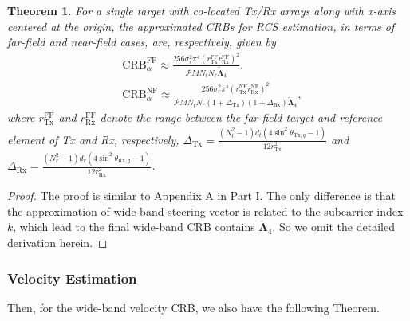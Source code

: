 \documentclass[9pt,final,journal,twocolumn]{IEEEtran}
\newtheorem{theorem}{Theorem}
\begin{document}
\begin{theorem}
For a single target with co-located Tx/Rx arrays
along with x-axis centered at the origin, the approximated CRBs for RCS
estimation, in terms of far-field and near-field cases, are,
respectively, given by
\begin{subequations} \label{CRB_RCS.2}
\begin{flalign} 
&\mathrm{CRB}_{\alpha}^{\mathrm{FF}}  \approx \frac{256\sigma_r^2\pi^{4}(r_{\mathrm{Tx}}^{\mathrm{FF}}r_{\mathrm{Rx}}^{\mathrm{FF}})^2}{\mathcal{P}M{N_t}{N_r}\widetilde{\bm\Lambda}_4}. \label{CRB_RCS.1.2}\\
&\mathrm{CRB}_{\alpha}^{\mathrm{NF}} \! \approx \! \frac{256\sigma_r^2\pi^{4}(r_{\mathrm{Tx}}^{\mathrm{NF}}r_{\mathrm{Rx}}^{\mathrm{NF}})^2}{\mathcal{P}M{N_t}{N_r}(1+\Delta_{\mathrm{Tx}})(1+\Delta_{\mathrm{Rx}})\widetilde{\bm\Lambda}_4}, \label{CRB_RCS.2.2}
\end{flalign} 
\end{subequations}
where $r_{\mathrm{Tx}}^{\mathrm{FF}}$ and $r_{\mathrm{Rx}}^{\mathrm{FF}}$ denote the range between the far-field target and reference element of Tx and Rx, respectively,  $\Delta_{\mathrm{Tx}}=\frac{(N_t^{2}-1)d_t(4\sin^2\theta_{\mathrm{Tx},q} - 1)}{12 r_{\mathrm{Tx}}^2}$ and $\Delta_{\mathrm{Rx}}=\frac{(N_r^{2}-1)d_r(4\sin^2\theta_{\mathrm{Rx},q} - 1)}{12 r_{\mathrm{Rx}}^2}$.
\end{theorem}

\begin{proof}
The proof is similar to Appendix A in Part I. The only
difference is that the approximation of wide-band steering vector is related to the subcarrier index $k$, which lead to the final wide-band CRB contains $\widetilde{\bm\Lambda}_4$.
So we omit the detailed derivation herein. 
\end{proof}


\subsubsection{Velocity Estimation} Then, for the wide-band velocity CRB, we also have the following Theorem.
\end{document}
